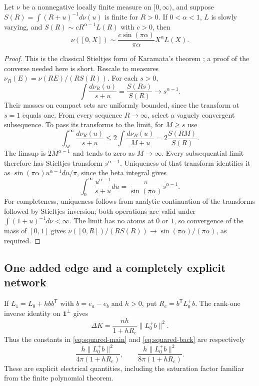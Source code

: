 \begin{lemma}\label{lem:stieltjes}
Let $\nu$ be a nonnegative locally finite measure on $[0,\infty)$,
and suppose $S(R)=\int(R+u)^{-1}d\nu(u)$ is finite for $R>0$.
If $0<\alpha<1$, $L$ is slowly varying, and
$S(R)\sim cR^{\alpha-1}L(R)$ with $c>0$, then
\[
 \nu([0,X])\sim\frac{c\sin(\pi\alpha)}{\pi\alpha}X^\alpha L(X).
\]
\end{lemma}
\begin{proof}
This is the classical Stieltjes form of Karamata's theorem
\cite[Theorem A.7 and Remark A.8]{langerworacek}; a proof of the converse
needed here is short.  Rescale to measures
$\nu_R(E)=\nu(RE)/(RS(R))$.  For each $s>0$,
\[
 \int\frac{d\nu_R(u)}{s+u}
      =\frac{S(Rs)}{S(R)}\longrightarrow s^{\alpha-1}.
\]
Their masses on compact sets are uniformly bounded, since the
transform at $s=1$ equals one.  From every sequence $R\to\infty$,
select a vaguely convergent subsequence.  To pass its transforms to
the limit, for $M\ge s$ use
\[
 \int_M^\infty\frac{d\nu_R(u)}{s+u}
       \le 2\int\frac{d\nu_R(u)}{M+u}
       =2\frac{S(RM)}{S(R)}.
\]
The limsup is $2M^{\alpha-1}$ and tends to zero as $M\to\infty$.
Every subsequential limit therefore has Stieltjes transform
$s^{\alpha-1}$.  Uniqueness of that transform identifies it as
$\sin(\pi\alpha)u^{\alpha-1}du/\pi$, since the beta integral gives
\[
 \int_0^\infty\frac{u^{\alpha-1}}{s+u}du
     =\frac{\pi}{\sin(\pi\alpha)}s^{\alpha-1}.
\]
For completeness, uniqueness follows from analytic continuation of
the transforms followed by Stieltjes inversion; both operations are
valid under $\int(1+u)^{-1}d\nu<\infty$.
The limit has no atoms at $0$ or $1$, so convergence of the mass of
$[0,1]$ gives
$\nu([0,R])/(RS(R))\to\sin(\pi\alpha)/(\pi\alpha)$, as required.
\end{proof}

\subsection{One added edge and a completely explicit network}

If $L_1=L_0+hbb^{\mathsf T}$ with $b=e_a-e_b$ and $h>0$, put
$R_e=b^{\mathsf T}L_0^+b$.  The rank-one inverse identity on
$\boldsymbol1^\perp$ gives
\begin{equation}\label{eq:kirchhoff-edge-drop}
 \Delta K=\frac{nh}{1+hR_e}\|L_0^+b\|^2.
\end{equation}
Thus the constants in \eqref{eq:squared-main} and
\eqref{eq:squared-back} are respectively
\[
 \frac{h\|L_0^+b\|^2}{4\pi(1+hR_e)},\qquad
 \frac{h\|L_0^+b\|^2}{8\pi(1+hR_e)}.
\]
These are explicit electrical quantities, including the saturation
factor familiar from the finite polynomial theorem.

